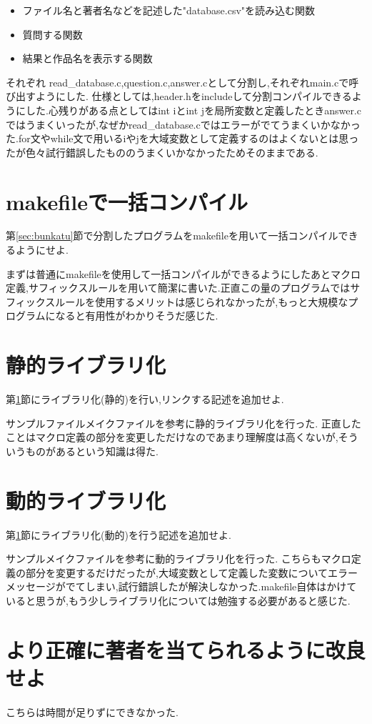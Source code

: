 \documentclass{jarticle}
\begin{document}
\begin{itemize}

\item ファイル名と著者名などを記述した"database.csv"を読み込む関数
\item 質問する関数
\item 結果と作品名を表示する関数

\end{itemize}

それぞれ read\_database.c,question.c,answer.cとして分割し,それぞれmain.cで呼び出すようにした.
仕様としては,header.hをincludeして分割コンパイルできるようにした.心残りがある点としてはint iとint jを局所変数と定義したときanswer.cではうまくいったが,なぜかread\_database.cではエラーがでてうまくいかなかった.for文やwhile文で用いるiやjを大域変数として定義するのはよくないとは思ったが色々試行錯誤したもののうまくいかなかったためそのままである.

\section{makefileで一括コンパイル}
\label{sec:makefile}
第\ref{sec:bunkatu}節で分割したプログラムをmakefileを用いて一括コンパイルできるようにせよ.

まずは普通にmakefileを使用して一括コンパイルができるようにしたあとマクロ定義,サフィックスルールを用いて簡潔に書いた.正直この量のプログラムではサフィックスルールを使用するメリットは感じられなかったが,もっと大規模なプログラムになると有用性がわかりそうだ感じた.

\section{静的ライブラリ化}
第\ref{sec:makefile}節にライブラリ化(静的)を行い,リンクする記述を追加せよ.

サンプルファイルメイクファイルを参考に静的ライブラリ化を行った.
正直したことはマクロ定義の部分を変更しただけなのであまり理解度は高くないが,そういうものがあるという知識は得た.

\section{動的ライブラリ化}
第\ref{sec:makefile}節にライブラリ化(動的)を行う記述を追加せよ.

サンプルメイクファイルを参考に動的ライブラリ化を行った.
こちらもマクロ定義の部分を変更するだけだったが,大域変数として定義した変数についてエラーメッセージがでてしまい,試行錯誤したが解決しなかった.makefile自体はかけていると思うが,もう少しライブラリ化については勉強する必要があると感じた.

\section{より正確に著者を当てられるように改良せよ}

こちらは時間が足りずにできなかった.
\end{document}
